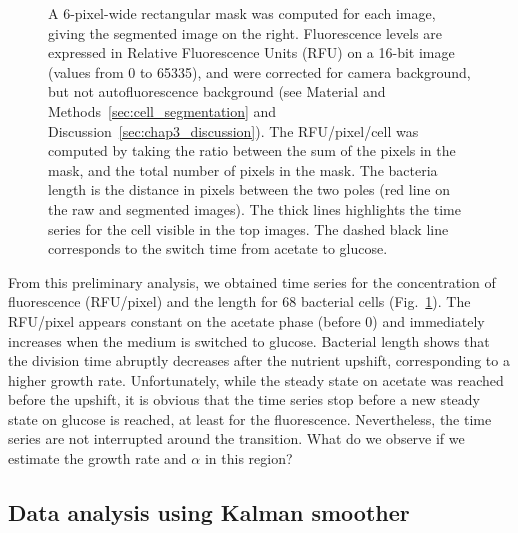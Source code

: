 \begin{figure}[p]
{A 6-pixel-wide rectangular mask was computed for each image, giving the segmented image on the right.
Fluorescence levels are expressed in Relative Fluorescence Units (RFU) on a 16-bit image (values from 0 to 65335), and were corrected for camera background, but not autofluorescence background (see Material and Methods~\ref{sec:cell_segmentation} and Discussion~\ref{sec:chap3_discussion}).
The RFU/pixel/cell was computed by taking the ratio between the sum of the pixels in the mask, and the total number of pixels in the mask.
The bacteria length is the distance in pixels between the two poles (red line on the raw and segmented images).
The thick lines highlights the time series for the cell visible in the top images.
The dashed black line corresponds to the switch time from acetate to glucose.
}
\label{fig:data_acquisition}
\end{figure}

From this preliminary analysis, we obtained time series for the concentration of fluorescence (RFU/pixel) and the length for 68 bacterial cells (Fig.~\ref{fig:data_acquisition}).
The RFU/pixel appears constant on the acetate phase (before 0) and immediately increases when the medium is switched to glucose.
Bacterial length shows that the division time abruptly decreases after the nutrient upshift, corresponding to a higher growth rate.
Unfortunately, while the steady state on acetate was reached before the upshift, it is obvious that the time series stop before a new steady state on glucose is reached, at least for the fluorescence.
Nevertheless, the time series are not interrupted around the transition.
What do we observe if we estimate the growth rate and $\alpha$ in this region?

\subsection{Data analysis using Kalman smoother}
\label{sec:res_kalman}

